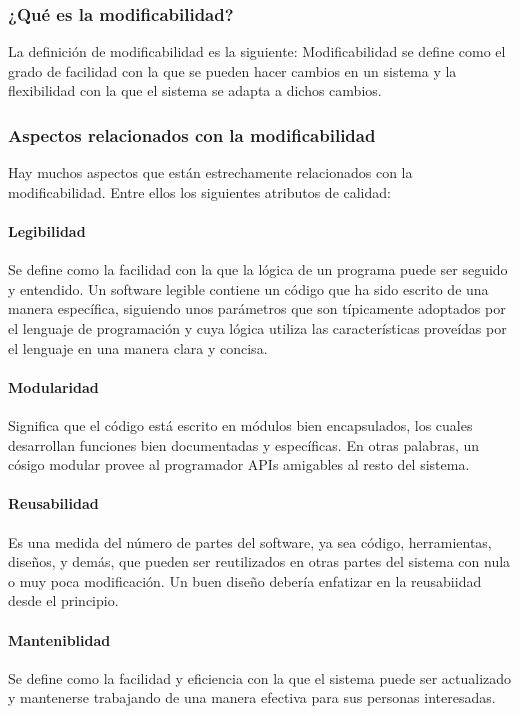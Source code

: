 \subsubsection{¿Qué es la modificabilidad?} La definición de modificabilidad es la siguiente: Modificabilidad se define como el grado de facilidad con la que se pueden hacer cambios en un sistema y la flexibilidad con la que el sistema se adapta a dichos cambios.

\subsubsection{Aspectos relacionados con la modificabilidad} Hay muchos aspectos que están estrechamente relacionados con la modificabilidad. Entre ellos los siguientes atributos de calidad:


\paragraph{Legibilidad} Se define como la facilidad con la que la lógica de un programa puede ser seguido y entendido. Un software legible contiene un código que ha sido escrito de una manera específica, siguiendo unos parámetros que son típicamente adoptados por el lenguaje de programación y cuya lógica utiliza las características proveídas por el  lenguaje en una manera clara y concisa.

\paragraph{Modularidad} Significa que el código está escrito en módulos bien encapsulados, los cuales desarrollan funciones bien documentadas y específicas. En otras palabras, un cósigo modular provee al programador APIs amigables al resto del sistema. 

\paragraph{Reusabilidad} Es una medida del número de partes del software, ya sea código, herramientas, diseños, y demás, que pueden ser reutilizados en otras partes del sistema con nula o muy poca modificación. Un buen diseño debería enfatizar en la reusabiidad desde el principio. 

\paragraph{Manteniblidad} Se define como la facilidad y eficiencia con la que el sistema puede ser actualizado y mantenerse trabajando de una manera efectiva para sus personas interesadas.

